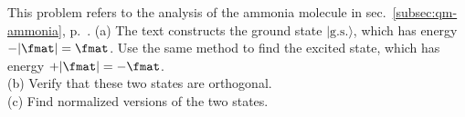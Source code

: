 This problem refers to the analysis of the ammonia molecule in
sec.~\ref{subsec:qm-ammonia}, p.~\pageref{subsec:qm-ammonia}. 
(a) The text constructs the ground state $|\text{g.s.}\rangle$, which has energy $-|\fmat|=\fmat$. Use the
same method to find the excited state, which has energy $+|\fmat|=-\fmat$.\\
(b) Verify that these two states are orthogonal.\\
(c) Find normalized versions of the two states.
